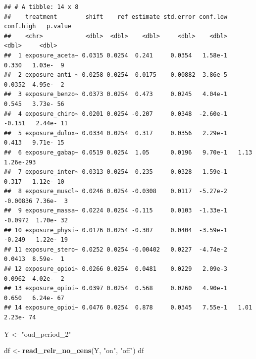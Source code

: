 \documentclass[
]{article}
\newenvironment{Shaded}{\begin{snugshade}}{\end{snugshade}}
\newcommand{\FunctionTok}[1]{\textcolor[rgb]{0.13,0.29,0.53}{\textbf{#1}}}
\newcommand{\NormalTok}[1]{#1}
\newcommand{\OtherTok}[1]{\textcolor[rgb]{0.56,0.35,0.01}{#1}}
\newcommand{\StringTok}[1]{\textcolor[rgb]{0.31,0.60,0.02}{#1}}
\begin{document}
\begin{verbatim}
## # A tibble: 14 x 8
##    treatment        shift    ref estimate std.error conf.low conf.high   p.value
##    <chr>            <dbl>  <dbl>    <dbl>     <dbl>    <dbl>     <dbl>     <dbl>
##  1 exposure_aceta~ 0.0315 0.0254  0.241     0.0354   1.58e-1   0.330   1.03e-  9
##  2 exposure_anti_~ 0.0258 0.0254  0.0175    0.00882  3.86e-5   0.0352  4.95e-  2
##  3 exposure_benzo~ 0.0373 0.0254  0.473     0.0245   4.04e-1   0.545   3.73e- 56
##  4 exposure_chiro~ 0.0201 0.0254 -0.207     0.0348  -2.60e-1  -0.151   2.44e- 11
##  5 exposure_dulox~ 0.0334 0.0254  0.317     0.0356   2.29e-1   0.413   9.71e- 15
##  6 exposure_gabap~ 0.0519 0.0254  1.05      0.0196   9.70e-1   1.13    1.26e-293
##  7 exposure_inter~ 0.0313 0.0254  0.235     0.0328   1.59e-1   0.317   1.12e- 10
##  8 exposure_muscl~ 0.0246 0.0254 -0.0308    0.0117  -5.27e-2  -0.00836 7.36e-  3
##  9 exposure_massa~ 0.0224 0.0254 -0.115     0.0103  -1.33e-1  -0.0972  1.70e- 32
## 10 exposure_physi~ 0.0176 0.0254 -0.307     0.0404  -3.59e-1  -0.249   1.22e- 19
## 11 exposure_stero~ 0.0252 0.0254 -0.00402   0.0227  -4.74e-2   0.0413  8.59e-  1
## 12 exposure_opioi~ 0.0266 0.0254  0.0481    0.0229   2.09e-3   0.0962  4.02e-  2
## 13 exposure_opioi~ 0.0397 0.0254  0.568     0.0260   4.90e-1   0.650   6.24e- 67
## 14 exposure_opioi~ 0.0476 0.0254  0.878     0.0345   7.55e-1   1.01    2.23e- 74
\end{verbatim}

\begin{Shaded}
\begin{Highlighting}[]
\NormalTok{Y }\OtherTok{\textless{}{-}} \StringTok{"oud\_period\_2"}

\NormalTok{df }\OtherTok{\textless{}{-}} \FunctionTok{read\_relr\_no\_cens}\NormalTok{(Y, }\StringTok{"on"}\NormalTok{, }\StringTok{"off"}\NormalTok{)}
\NormalTok{df}
\end{Highlighting}
\end{Shaded}
\end{document}
